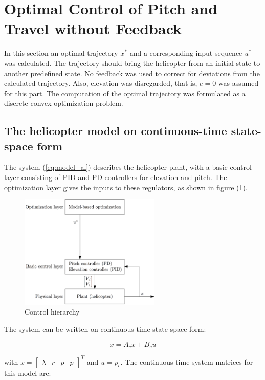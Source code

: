 \section{Optimal Control of Pitch and Travel without Feedback}\label{sec:prob2}

In this section an optimal trajectory $x^*$ and a corresponding input sequence $u^*$ was calculated. The trajectory should bring the helicopter from an initial state to another predefined state. No feedback was used to correct for deviations from the calculated trajectory. Also, elevation was disregarded, that is, $e=0$ was assumed for this part. The computation of the optimal trajectory was formulated as a discrete convex optimization problem.


\subsection{The helicopter model on continuous-time state-space form}

The system (\ref{eq:model_al}) describes the helicopter plant, with a basic control layer consisting of PID and PD controllers for elevation and pitch. The optimization layer gives the inputs to these regulators, as shown in figure (\ref{fig:control_hierarchy}).

\begin{figure}[ht]
	\centering
	\includegraphics[width=0.6\textwidth]{figures/day2/control_hierarchy_day2}
	\caption{Control hierarchy}
	\label{fig:control_hierarchy}
\end{figure}

The system can be written on continuous-time state-space form:

\begin{equation}
    \dot{x} = A_cx + B_cu
    \label{eq:state_space_axbu}
\end{equation}

with $x = \begin{bmatrix} \lambda & r & p & \dot{p} \end{bmatrix}^T$ and $u = p_c$.
The continuous-time system matrices for this model are:


